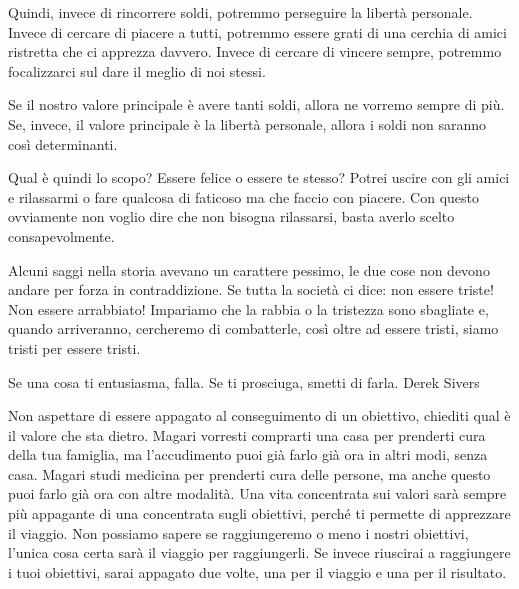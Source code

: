 \documentclass[12pt]{book} %
\begin{document}
Quindi, invece di rincorrere soldi, potremmo perseguire la libertà personale. Invece di cercare di piacere a tutti,
potremmo essere grati di una cerchia di amici ristretta che ci apprezza davvero. 
Invece di cercare di vincere sempre, potremmo focalizzarci sul dare il meglio di noi stessi. 

Se il nostro valore principale è avere tanti soldi, allora ne vorremo sempre di più. Se, invece, il valore principale è la libertà
personale, allora i soldi non saranno così determinanti. 

Qual è quindi lo scopo? Essere felice o essere te stesso? Potrei uscire con gli
amici e rilassarmi o fare qualcosa di faticoso ma che faccio con piacere. Con questo ovviamente non voglio dire che non
bisogna rilassarsi, basta averlo scelto consapevolmente.

Alcuni saggi nella storia avevano un carattere pessimo, le due cose non devono andare per forza in contraddizione. 
Se tutta la società ci dice: non essere triste! Non essere arrabbiato! Impariamo che la rabbia o la tristezza sono sbagliate e, quando arriveranno, cercheremo di combatterle, così oltre ad essere tristi, siamo tristi per essere tristi.

Se una cosa ti entusiasma, falla. Se ti prosciuga, smetti di farla.
Derek Sivers 

Non aspettare di essere appagato al conseguimento di un obiettivo, chiediti qual è il valore
che sta dietro. Magari vorresti comprarti una casa per prenderti cura della tua famiglia, ma l'accudimento puoi già farlo già ora in altri modi, senza casa.
Magari studi medicina per prenderti cura delle persone, ma anche questo puoi farlo già ora con altre modalità. Una vita
concentrata sui valori sarà sempre più appagante di una concentrata sugli obiettivi, perché ti permette di apprezzare
il viaggio. Non possiamo sapere se raggiungeremo o meno i nostri obiettivi, l'unica cosa certa
sarà il viaggio per raggiungerli. Se invece riuscirai a raggiungere i tuoi obiettivi, sarai appagato due volte, una per
il viaggio e una per il risultato.
\end{document}
